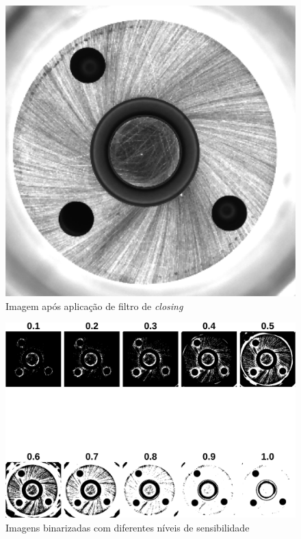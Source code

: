 \documentclass[conference]{IEEEtran}
\begin{document}
\begin{figure}[h]
	\centering
	\includegraphics[scale=0.21]{Images/Image0000_closed.png}
	\caption{Imagem após aplicação de filtro de \textit{closing}}
	\label{fig:imClosed}
\end{figure}

\begin{figure}[h]
	\centering
	\includegraphics[scale=0.70]{Images/Image0000_sensitivity.png}
	\caption{Imagens binarizadas com diferentes níveis de sensibilidade}
	\label{fig:sensivities}
\end{figure}
\end{document}
